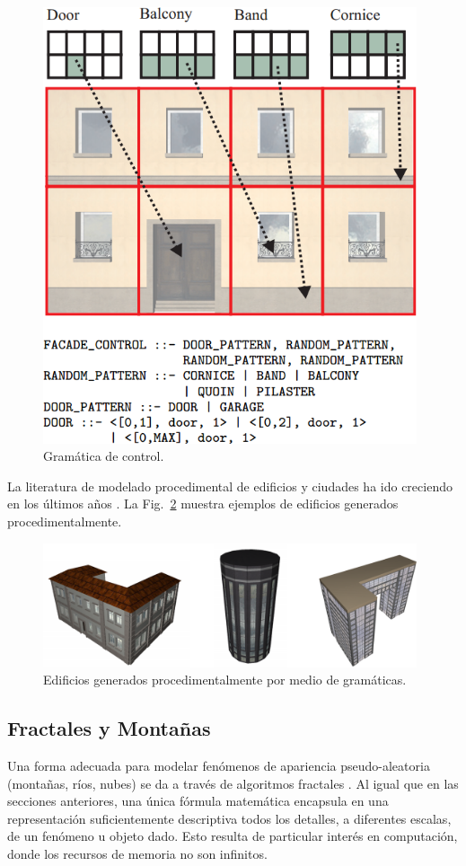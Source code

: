 \begin{figure}
\center
\includegraphics[width=11cm]{figures/controlgrammar}
\caption{Gramática de control.}
\label{fg:controlgrammar}
\end{figure}

La literatura de modelado procedimental de edificios y ciudades ha ido creciendo en los últimos años \cite{Parish2001,Muller2006}.
La Fig.~\ref{fg:edificios} muestra ejemplos de edificios generados procedimentalmente.


\begin{figure}
\center
\includegraphics[width=11cm]{figures/edificios}
\caption{Edificios generados procedimentalmente por medio de gramáticas.}
\label{fg:edificios}
\end{figure}

\subsection{Fractales y Montañas}
Una forma adecuada para modelar fenómenos de apariencia pseudo-aleatoria (montañas, ríos, nubes) se da a través de algoritmos fractales \cite{Mandelbrot1983}.
Al igual que en las secciones anteriores, una única fórmula matemática encapsula en una representación suficientemente descriptiva todos los detalles, a diferentes escalas, de un fenómeno u objeto dado.
Esto resulta de particular interés en computación, donde los recursos de memoria no son infinitos.

